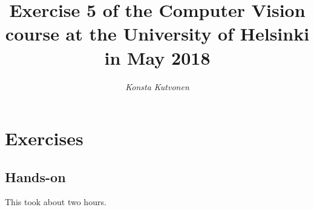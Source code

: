 \documentclass{article}
\begin{document}
\title{Exercise 5 of the Computer Vision course at the
  University of Helsinki in May 2018}

\author{\emph{Konsta Kutvonen}}
\maketitle



\newpage
\section{Exercises}
\subsection{Hands-on}
This took about two hours.
\newpage
\end{document}
